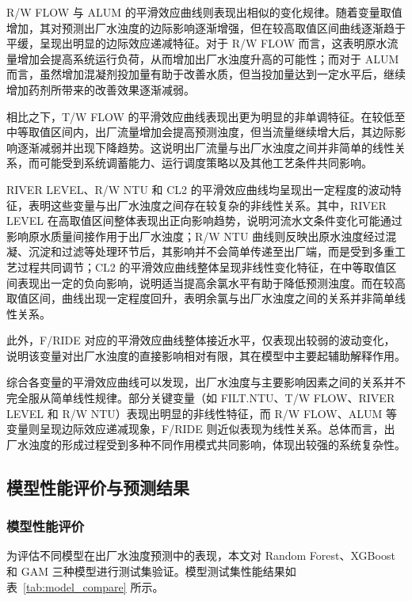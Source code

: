 \documentclass[UTF8,zihao=-4]{ctexart}
\begin{document}
R/W FLOW 与 ALUM 的平滑效应曲线则表现出相似的变化规律。随着变量取值增加，其对预测出厂水浊度的边际影响逐渐增强，但在较高取值区间曲线逐渐趋于平缓，呈现出明显的边际效应递减特征。对于 R/W FLOW 而言，这表明原水流量增加会提高系统运行负荷，从而增加出厂水浊度升高的可能性；而对于 ALUM 而言，虽然增加混凝剂投加量有助于改善水质，但当投加量达到一定水平后，继续增加药剂所带来的改善效果逐渐减弱。

相比之下，T/W FLOW 的平滑效应曲线表现出更为明显的非单调特征。在较低至中等取值区间内，出厂流量增加会提高预测浊度，但当流量继续增大后，其边际影响逐渐减弱并出现下降趋势。这说明出厂流量与出厂水浊度之间并非简单的线性关系，而可能受到系统调蓄能力、运行调度策略以及其他工艺条件共同影响。

RIVER LEVEL、R/W NTU 和 CL2 的平滑效应曲线均呈现出一定程度的波动特征，表明这些变量与出厂水浊度之间存在较复杂的非线性关系。其中，RIVER LEVEL 在高取值区间整体表现出正向影响趋势，说明河流水文条件变化可能通过影响原水质量间接作用于出厂水浊度；R/W NTU 曲线则反映出原水浊度经过混凝、沉淀和过滤等处理环节后，其影响并不会简单传递至出厂端，而是受到多重工艺过程共同调节；CL2 的平滑效应曲线整体呈现非线性变化特征，在中等取值区间表现出一定的负向影响，说明适当提高余氯水平有助于降低预测浊度。而在较高取值区间，曲线出现一定程度回升，表明余氯与出厂水浊度之间的关系并非简单线性关系。

此外，F/RIDE 对应的平滑效应曲线整体接近水平，仅表现出较弱的波动变化，说明该变量对出厂水浊度的直接影响相对有限，其在模型中主要起辅助解释作用。

综合各变量的平滑效应曲线可以发现，出厂水浊度与主要影响因素之间的关系并不完全服从简单线性规律。部分关键变量（如 FILT.NTU、T/W FLOW、RIVER LEVEL 和 R/W NTU）表现出明显的非线性特征，而 R/W FLOW、ALUM 等变量则呈现边际效应递减现象，F/RIDE 则近似表现为线性关系。总体而言，出厂水浊度的形成过程受到多种不同作用模式共同影响，体现出较强的系统复杂性。


\subsection{模型性能评价与预测结果}

\subsubsection{模型性能评价}

为评估不同模型在出厂水浊度预测中的表现，本文对 Random Forest、XGBoost 和 GAM 三种模型进行测试集验证。模型测试集性能结果如表~\ref{tab:model_compare} 所示。
\end{document}
